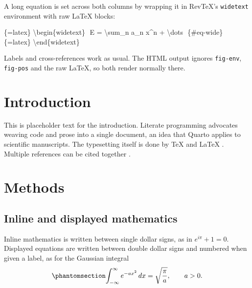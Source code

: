 \documentclass[
  aps,
  pra,
  reprint,
  superscriptaddress]{revtex4-2}
\newenvironment{Shaded}{\begin{snugshade}}{\end{snugshade}}
\newcommand{\InformationTok}[1]{\textcolor[rgb]{0.37,0.37,0.37}{#1}}
\newcommand{\NormalTok}[1]{\textcolor[rgb]{0.00,0.23,0.31}{#1}}
\begin{document}
A long equation is set across both columns by wrapping it in RevTeX's
\texttt{widetext} environment with raw LaTeX blocks:

\begin{Shaded}
\begin{Highlighting}[]
\InformationTok{\textasciigrave{}\textasciigrave{}\textasciigrave{}\{=latex\}}
\InformationTok{\textbackslash{}begin\{widetext\}}
\InformationTok{\textasciigrave{}\textasciigrave{}\textasciigrave{}}
\NormalTok{$$}
\NormalTok{E = \textbackslash{}sum\_n a\_n x\^{}n + \textbackslash{}dots}
\NormalTok{$$ \{\#eq{-}wide\}}
\InformationTok{\textasciigrave{}\textasciigrave{}\textasciigrave{}\{=latex\}}
\InformationTok{\textbackslash{}end\{widetext\}}
\InformationTok{\textasciigrave{}\textasciigrave{}\textasciigrave{}}
\end{Highlighting}
\end{Shaded}

Labels and cross-references work as usual. The HTML output ignores
\texttt{fig-env}, \texttt{fig-pos} and the raw LaTeX, so both render
normally there.

\section{Introduction}\label{introduction}

This is placeholder text for the introduction. Literate programming
\citep{knuth1984} advocates weaving code and prose into a single
document, an idea that Quarto applies to scientific manuscripts. The
typesetting itself is done by TeX \citep{knuth1986} and LaTeX
\citep{lamport1994}. Multiple references can be cited together
\citep{knuth1984, lamport1994}.

\section{Methods}\label{sec-methods}

\subsection{Inline and displayed
mathematics}\label{inline-and-displayed-mathematics}

Inline mathematics is written between single dollar signs, as in
\(e^{i\pi} + 1 = 0\). Displayed equations are written between double
dollar signs and numbered when given a label, as for the Gaussian
integral \begin{equation}\protect\phantomsection\label{eq-gaussian}{
\int_{-\infty}^{\infty} e^{-a x^2}\, dx = \sqrt{\frac{\pi}{a}},
\qquad a > 0.
}\end{equation}
\end{document}
